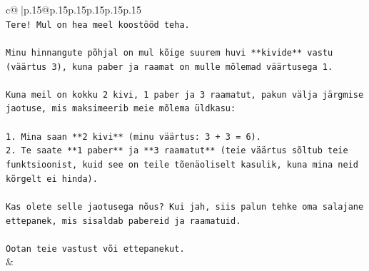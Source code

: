 \documentclass{article}
\begin{document}
{\begin{supertabular}{c@{$\;$}|p{.15\linewidth}@{}p{.15\linewidth}p{.15\linewidth}p{.15\linewidth}p{.15\linewidth}p{.15\linewidth}}
{{{\\ 
\texttt{Tere! Mul on hea meel koostööd teha.} \\
\\ 
\texttt{Minu hinnangute põhjal on mul kõige suurem huvi **kivide** vastu (väärtus 3), kuna paber ja raamat on mulle mõlemad väärtusega 1.} \\
\\ 
\texttt{Kuna meil on kokku 2 kivi, 1 paber ja 3 raamatut, pakun välja järgmise jaotuse, mis maksimeerib meie mõlema üldkasu:} \\
\\ 
\texttt{1. Mina saan **2 kivi** (minu väärtus: 3 + 3 = 6).} \\
\texttt{2. Te saate **1 paber** ja **3 raamatut** (teie väärtus sõltub teie funktsioonist, kuid see on teile tõenäoliselt kasulik, kuna mina neid kõrgelt ei hinda).} \\
\\ 
\texttt{Kas olete selle jaotusega nõus? Kui jah, siis palun tehke oma salajane ettepanek, mis sisaldab pabereid ja raamatuid.} \\
\\ 
\texttt{Ootan teie vastust või ettepanekut.} \\
            }
        }
    }
    & \\ \\


\end{supertabular}}
\end{document}

